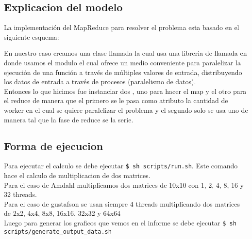 \subsection{Explicacion del modelo}
    La implementación del MapReduce para resolver el problema esta basado en el
    siguiente esquema:\\
    \begin{figure}[ht]
    \end{figure}
    \FloatBarrier

    En nuestro caso creamos una clase llamada  la cual usa una
    libreria de  llamada  en donde usamos el
    modulo  el cual ofrece un medio conveniente para paralelizar la
    ejecución de una función a través de múltiples valores de entrada, distribuyendo
    los datos de entrada a través de procesos (paralelismo de datos).\\

    Entonces lo que hicimos fue instanciar dos , uno para hacer el map y
    el otro para el reduce de manera que el primero se le pasa como atributo la
    cantidad de worker en el cual se quiere paralelizar el problema y el segundo
    solo se usa uno de manera tal que la fase de reduce se la serie.

\subsection{Forma de ejecucion}
    Para ejecutar el calculo se debe ejecutar \lstinline[columns=fixed]{$ sh scripts/run.sh}.
    Este comando hace el calculo de multiplicacion de dos matrices.\\
    Para el caso de Amdahl multiplicamos dos matrices de 10x10
    con 1, 2, 4, 8, 16 y 32 threads.\\
    Para el caso de gustafson se usan siempre 4 threads multiplicando dos matrices
    de 2x2, 4x4, 8x8, 16x16, 32x32 y 64x64\\
    Luego para generar los graficos que vemos en el informe se debe
    ejecutar \lstinline[columns=fixed]{$ sh scripts/generate_output_data.sh}

